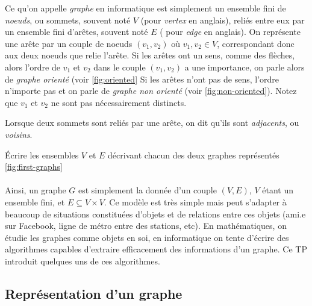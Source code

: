 Ce qu'on appelle \textit{graphe} en informatique est simplement un ensemble fini de \textit{noeuds}, ou sommets, souvent noté $ V $ (pour \textit{vertex} en anglais), reliés entre eux par un ensemble fini d'arêtes, souvent noté $ E $ ( pour \textit{edge} en anglais). On représente une arête par un couple de noeuds $ (v_1, v_2) $ où $ v_1, v_2 \in V $, correspondant donc aux deux noeuds que relie l'arête. Si les arêtes ont un sens, comme des flèches, alors l'ordre de $ v_1 $ et $ v_2 $ dans le couple $ (v_1, v_2)  $ a une importance, on parle alors de \textit{graphe orienté} (voir \autoref{fig:oriented} Si les arêtes n'ont pas de sens, l'ordre n'importe pas et on parle de \textit{graphe non orienté} (voir \autoref{fig:non-oriented}). Notez que $ v_1 $ et $ v_2 $ ne sont pas nécessairement distincts.

Lorsque deux sommets sont reliés par une arête, on dit qu'ils sont \textit{adjacents}, ou \textit{voisins}.

\ques Écrire les ensembles $ V $ et $ E $ décrivant chacun des deux graphes représentés \autoref{fig:first-graphs}

\paragraph{} Ainsi, un graphe $ G $ est simplement la donnée d'un couple $ (V, E) $, $ V $ étant un ensemble fini, et $ E \subseteq V \times V $. Ce modèle est très simple mais peut s'adapter à beaucoup de situations constituées d'objets et de relations entre ces objets (ami.e sur Facebook, ligne de métro entre des stations, etc). En mathématiques, on étudie les graphes comme objets en soi, en informatique on tente d'écrire des algorithmes capables d'extraire efficacement des informations d'un graphe. Ce TP introduit quelques uns de ces algorithmes.

\subsection*{Représentation d'un graphe}

